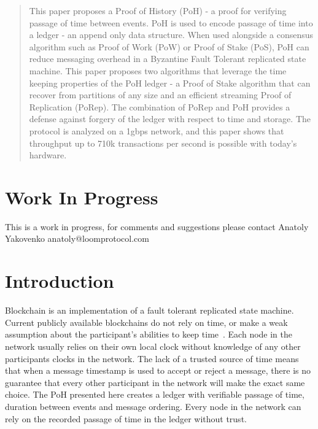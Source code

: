 \documentclass[12pt]{article}
\begin{document}
\maketitle

\begin{abstract}
This paper proposes a Proof of History (PoH) - a proof for verifying passage of time between events. PoH is used to encode passage of time into a ledger - an append only data structure.  When used alongside a consensus algorithm such as Proof of Work (PoW) or Proof of Stake (PoS), PoH can reduce messaging overhead in a Byzantine Fault Tolerant replicated state machine.  This paper proposes two algorithms that leverage the time keeping properties of the PoH ledger - a Proof of Stake algorithm that can recover from partitions of any size and an efficient streaming Proof of Replication (PoRep).  The combination of PoRep and PoH provides a defense against forgery of the ledger with respect to time and storage.  The protocol is analyzed on a 1gbps network, and this paper shows that throughput up to 710k transactions per second is possible with today's hardware.
\end{abstract}

\section{Work In Progress}
This is a work in progress, for comments and suggestions please contact Anatoly Yakovenko anatoly@loomprotocol.com

\section{Introduction}
Blockchain is an implementation of a fault tolerant replicated state machine.  Current publicly available blockchains do not rely on time, or make a weak assumption about the participant's abilities to keep time~\cite{tendermint}.  Each node in the network usually relies on their own local clock without knowledge of any other participants clocks in the network.  The lack of a trusted source of time means that when a message timestamp is used to accept or reject a message, there is no guarantee that every other participant in the network will make the exact same choice.  The PoH presented here creates a ledger with verifiable passage of time, duration between events and message ordering. Every node in the network can rely on the recorded passage of time in the ledger without trust.
\end{document}
